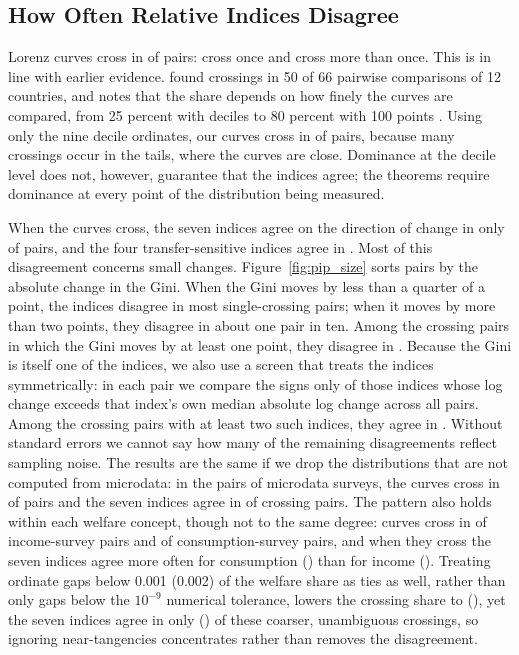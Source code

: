 \documentclass[12pt]{article}
\theoremstyle{plain}
\theoremstyle{definition}
\theoremstyle{remark}
\begin{document}
\subsection{How Often Relative Indices Disagree}

Lorenz curves cross in \PipShareCross{} of pairs: \PipShareSingle{} cross once and \PipShareMulti{} cross more than once.
This is in line with earlier evidence.
\citet{Atkinson1970} found crossings in 50 of 66 pairwise comparisons of 12 countries, and \citet{Figini2000} notes that the share depends on how finely the curves are compared, from 25 percent with deciles \citep{Bishop1991} to 80 percent with 100 points \citep{Buhmann1988}.
Using only the nine decile ordinates, our curves cross in \PipShareCrossDecile{} of pairs, because many crossings occur in the tails, where the curves are close.
Dominance at the decile level does not, however, guarantee that the indices agree; the theorems require dominance at every point of the distribution being measured.

When the curves cross, the seven indices agree on the direction of change in only \PipTpAgreeCross{} of pairs, and the four transfer-sensitive indices agree in \PipDtsAgreeCross{}.
Most of this disagreement concerns small changes.
Figure~\ref{fig:pip_size} sorts pairs by the absolute change in the Gini.
When the Gini moves by less than a quarter of a point, the indices disagree in most single-crossing pairs; when it moves by more than two points, they disagree in about one pair in ten.
Among the \PipNMaterialCross{} crossing pairs in which the Gini moves by at least one point, they disagree in \PipTpDisMaterialCross{}.
Because the Gini is itself one of the indices, we also use a screen that treats the indices symmetrically: in each pair we compare the signs only of those indices whose log change exceeds that index's own median absolute log change across all pairs.
Among the \PipNBigCross{} crossing pairs with at least two such indices, they agree in \PipTpAgreeBigCross{}.
Without standard errors we cannot say how many of the remaining disagreements reflect sampling noise.
The results are the same if we drop the distributions that are not computed from microdata: in the \PipNMicroPairs{} pairs of microdata surveys, the curves cross in \PipShareCrossMicro{} of pairs and the seven indices agree in \PipTpAgreeCrossMicro{} of crossing pairs.
The pattern also holds within each welfare concept, though not to the same degree: curves cross in \PipShareCrossIncome{} of income-survey pairs and \PipShareCrossConsumption{} of consumption-survey pairs, and when they cross the seven indices agree more often for consumption (\PipTpAgreeCrossConsumption{}) than for income (\PipTpAgreeCrossIncome{}).
Treating ordinate gaps below 0.001 (0.002) of the welfare share as ties as well, rather than only gaps below the $10^{-9}$ numerical tolerance, lowers the crossing share to \PipShareCrossTieOne{} (\PipShareCrossTieTwo{}), yet the seven indices agree in only \PipTpAgreeCrossTieOne{} (\PipTpAgreeCrossTieTwo{}) of these coarser, unambiguous crossings, so ignoring near-tangencies concentrates rather than removes the disagreement.
\end{document}
